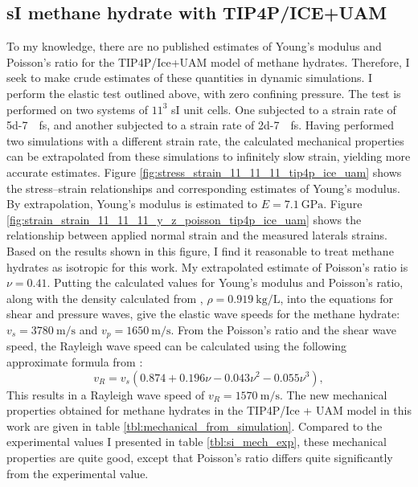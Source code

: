 \subsection{sI methane hydrate with TIP4P/ICE+UAM}
To my knowledge, there are no published estimates of Young's modulus and Poisson's ratio for the TIP4P/Ice+UAM model of methane hydrates. Therefore, I seek to make crude estimates of these quantities in dynamic simulations. I perform the elastic test outlined above, with zero confining pressure. The test is performed on two systems of $11^3$ sI unit cells. One subjected to a strain rate of \SI{5d-7}{\per\femto\second}, and another subjected to a strain rate of \SI{2d-7}{\per\femto\second}. Having performed two simulations with a different strain rate, the calculated mechanical properties can be extrapolated from these simulations to infinitely slow strain, yielding more accurate estimates.
Figure \ref{fig:stress_strain_11_11_11_tip4p_ice_uam} shows the stress--strain relationships and corresponding estimates of Young's modulus. By extrapolation, Young's modulus is estimated to $E = \SI{7.1}{\giga\pascal}$.
Figure \ref{fig:strain_strain_11_11_11_y_z_poisson_tip4p_ice_uam} shows the relationship between applied normal strain and the measured laterals strains. Based on the results shown in this figure, I find it reasonable to treat methane hydrates as isotropic for this work. My extrapolated estimate of Poisson's ratio is $\nu = 0.41$. Putting the calculated values for Young's modulus and Poisson's ratio, along with the density calculated from \citet{Ning2010}, $\rho = \SI{0.919}{\kilo\gram\per\liter}$, into the equations for shear and pressure waves, give the elastic wave speeds for the methane hydrate: $v_s=\SI{3780}{\meter\per\second}$ and $v_p = \SI{1650}{\meter\per\second}$. From the Poisson's ratio and the shear wave speed, the Rayleigh wave speed can be calculated using the following approximate formula from \cite{0957-4484-16-6-N01}:
\begin{equation}
v_R = v_s(0.874 + 0.196\nu − 0.043\nu^{2} − 0.055\nu^{3}),
\end{equation}
This results in a Rayleigh wave speed of $v_R = \SI{1570}{\meter\per\second}$.
The new mechanical properties obtained for methane hydrates in the TIP4P/Ice + UAM model in this work are given in table \ref{tbl:mechanical_from_simulation}. Compared to the experimental values I presented in table \ref{tbl:si_mech_exp}, these mechanical properties are quite good, except that Poisson's ratio differs quite significantly from the experimental value.
